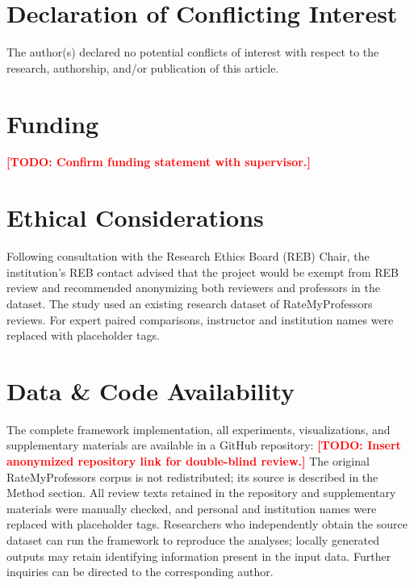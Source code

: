 \documentclass[fleqn,10pt]{JLA_article}
\newcommand{\todo}[1]{\textcolor{red}{\textbf{[TODO: #1]}}}
\begin{document}
\section*{Declaration of Conflicting Interest}

The author(s) declared no potential conflicts of interest with respect to the research, authorship, and/or publication of this article.

\section*{Funding}

\todo{Confirm funding statement with supervisor.}

\section*{Ethical Considerations}

Following consultation with the Research Ethics Board (REB) Chair, the institution's REB contact advised that the project would be exempt from REB review and recommended anonymizing both reviewers and professors in the dataset. The study used an existing research dataset of RateMyProfessors reviews. For expert paired comparisons, instructor and institution names were replaced with placeholder tags.

\section*{Data \& Code Availability}

The complete framework implementation, all experiments, visualizations, and supplementary materials are available in a GitHub repository: \todo{Insert anonymized repository link for double-blind review.} The original RateMyProfessors corpus is not redistributed; its source is described in the Method section. All review texts retained in the repository and supplementary materials were manually checked, and personal and institution names were replaced with placeholder tags. Researchers who independently obtain the source dataset can run the framework to reproduce the analyses; locally generated outputs may retain identifying information present in the input data. Further inquiries can be directed to the corresponding author.



\end{document}
